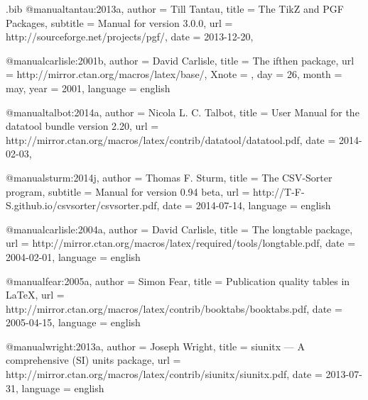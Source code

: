 \documentclass[a4paper,11pt]{ltxdoc}
\begin{document}
\begin{tcbverbatimwrite}{\jobname.bib}
@manual{tantau:2013a,
   author    = {Till Tantau},
   title     = {The TikZ and PGF Packages},
   subtitle  = {Manual for version 3.0.0},
   url       = {http://sourceforge.net/projects/pgf/},
   date      = {2013-12-20},
}


@manual{carlisle:2001b,
   author    = {David Carlisle},
   title     = {The ifthen package},
   url       = {http://mirror.ctan.org/macros/latex/base/},
   Xnote      = {},
   day       = 26,
   month     = may,
   year      = 2001,
   language  = {english}
}

@manual{talbot:2014a,
  author    = {Nicola L. C. Talbot},
  title     = {User Manual for the datatool bundle version 2.20},
  url       = {http://mirror.ctan.org/macros/latex/contrib/datatool/datatool.pdf},
  date      = {2014-02-03},
}

@manual{sturm:2014j,
   author      = {Thomas F. Sturm},
   title       = {The CSV-Sorter program},
   subtitle    = {Manual for version 0.94 beta},
   url         = {http://T-F-S.github.io/csvsorter/csvsorter.pdf},
   date        = {2014-07-14},
   language    = {english}
}

@manual{carlisle:2004a,
   author    = {David Carlisle},
   title     = {The longtable package},
   url       = {http://mirror.ctan.org/macros/latex/required/tools/longtable.pdf},
   date      = {2004-02-01},
   language  = {english}
}

@manual{fear:2005a,
   author    = {Simon Fear},
   title     = {Publication quality tables in \LaTeX},
   url       = {http://mirror.ctan.org/macros/latex/contrib/booktabs/booktabs.pdf},
   date      = {2005-04-15},
   language  = {english}
}

@manual{wright:2013a,
   author    = {Joseph Wright},
   title     = {siunitx --- A comprehensive (SI) units package},
   url       = {http://mirror.ctan.org/macros/latex/contrib/siunitx/siunitx.pdf},
   date      = {2013-07-31},
   language  = {english}
}

\end{tcbverbatimwrite}


\printbibliography[heading=bibintoc]

\printindex
\end{document}
